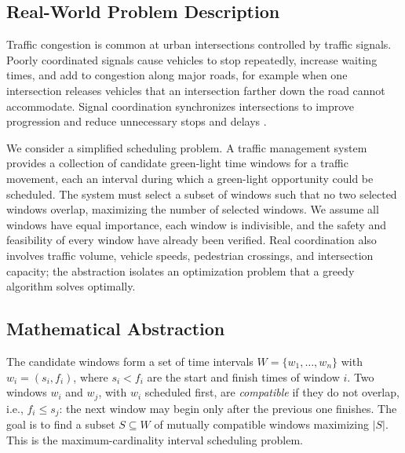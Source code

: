 \subsection{Real-World Problem Description}

Traffic congestion is common at urban intersections
controlled by traffic signals. Poorly coordinated
signals cause vehicles to stop repeatedly, increase
waiting times, and add to congestion along major
roads, for example when one intersection releases
vehicles that an intersection farther down the road
cannot accommodate. Signal coordination synchronizes
intersections to improve progression and reduce
unnecessary stops and delays \cite{fhwa2008}.

We consider a simplified scheduling problem. A traffic
management system provides a collection of candidate
green-light time windows for a traffic movement, each
an interval during which a green-light opportunity
could be scheduled. The system must select a subset of
windows such that no two selected windows overlap,
maximizing the number of selected windows. We assume
all windows have equal importance, each window is
indivisible, and the safety and feasibility of every
window have already been verified. Real coordination
also involves traffic volume, vehicle speeds,
pedestrian crossings, and intersection capacity; the
abstraction isolates an optimization problem that a
greedy algorithm solves optimally.

\subsection{Mathematical Abstraction}

The candidate windows form a set of time intervals
$W = \{w_1, \ldots, w_n\}$ with $w_i = (s_i, f_i)$,
where $s_i < f_i$ are the start and finish times of
window $i$. Two windows $w_i$ and $w_j$, with $w_i$
scheduled first, are \emph{compatible} if they do not
overlap, i.e., $f_i \leq s_j$: the next window may
begin only after the previous one finishes. The goal
is to find a subset $S \subseteq W$ of mutually
compatible windows maximizing $|S|$. This is the
maximum-cardinality interval scheduling problem.
